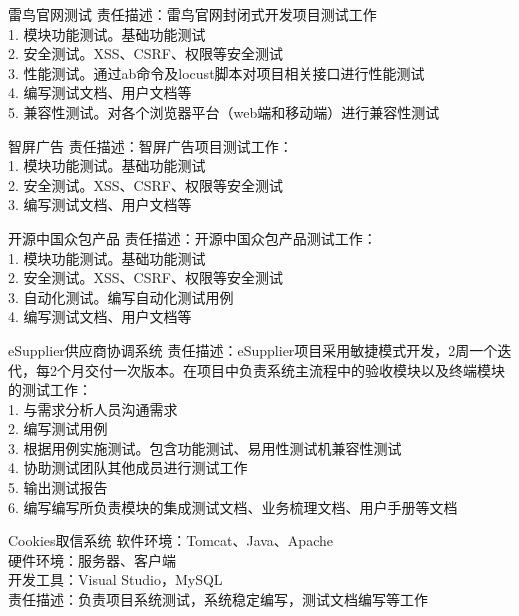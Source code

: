 \documentclass[11pt,a4paper]{moderncv}
\begin{document}
{雷鸟官网测试}{}{}{}
{责任描述：雷鸟官网封闭式开发项目测试工作\\
1. 模块功能测试。基础功能测试\\
2. 安全测试。XSS、CSRF、权限等安全测试\\
3. 性能测试。通过ab命令及locust脚本对项目相关接口进行性能测试\\
4. 编写测试文档、用户文档等\\
5. 兼容性测试。对各个浏览器平台（web端和移动端）进行兼容性测试
}

{智屏广告}{}{}{}
{责任描述：智屏广告项目测试工作：\\
1. 模块功能测试。基础功能测试\\
2. 安全测试。XSS、CSRF、权限等安全测试\\
3. 编写测试文档、用户文档等
}

{开源中国众包产品}{}{}{}
{责任描述：开源中国众包产品测试工作：\\
1. 模块功能测试。基础功能测试\\
2. 安全测试。XSS、CSRF、权限等安全测试\\
3. 自动化测试。编写自动化测试用例\\
4. 编写测试文档、用户文档等
}

{eSupplier供应商协调系统}{}{}{}
{责任描述：eSupplier项目采用敏捷模式开发，2周一个迭代，每2个月交付一次版本。在项目中负责系统主流程中的验收模块以及终端模块的测试工作：\\
1. 与需求分析人员沟通需求\\
2. 编写测试用例\\
3. 根据用例实施测试。包含功能测试、易用性测试机兼容性测试\\
4. 协助测试团队其他成员进行测试工作\\
5. 输出测试报告\\
6. 编写编写所负责模块的集成测试文档、业务梳理文档、用户手册等文档
}


{Cookies取信系统}
{}
{}{}
{软件环境：Tomcat、Java、Apache\\
硬件环境：服务器、客户端\\
开发工具：Visual Studio，MySQL\\
责任描述：负责项目系统测试，系统稳定编写，测试文档编写等工作
}
\end{document}
